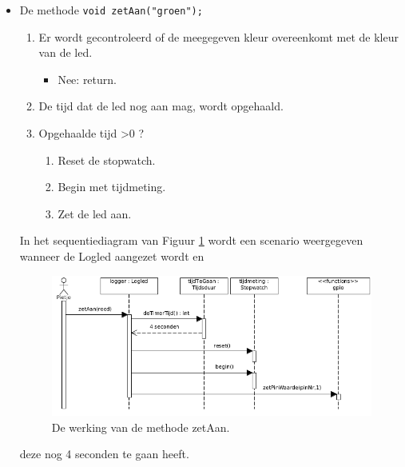 \begin{itemize}
	\item De methode \texttt{void zetAan("groen");}  
	  \begin{enumerate}
	  	\item Er wordt gecontroleerd of de meegegeven kleur overeenkomt met de kleur van de led.
	  	\begin{itemize}
	  		\item Nee: return.
	  		
	  	\end{itemize}
	  	\item De tijd dat de led nog aan mag, wordt opgehaald.
	  	\item Opgehaalde tijd \textgreater  0 ?
	  		  	\begin{enumerate}
	  		\item Reset de stopwatch.
	  		\item Begin met tijdmeting.
	  		\item Zet de led aan.	  		
	  	\end{enumerate}
	  \end{enumerate}
  In het sequentiediagram van Figuur \ref{fig:ll_zetAan} wordt een scenario weergegeven wanneer de Logled aangezet wordt en 
      \begin{figure}[h!]
  	\captionsetup{justification=centering}
  	\includegraphics[width=0.8 \linewidth]{figuren/seqZetAan}      %
  \centering
  \caption{De werking van de methode zetAan.}
  \label{fig:ll_zetAan}
\end{figure} 
 deze nog 4 seconden te gaan heeft. 


\end{itemize}
